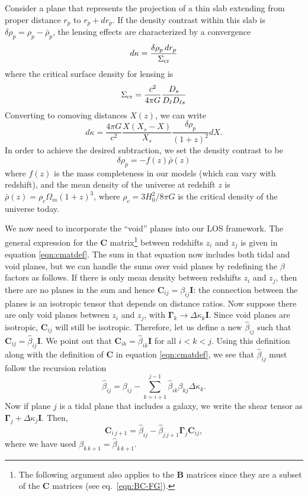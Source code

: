 \documentclass{emulateapj}
\newcommand\B[0]{\mathbf{B}}
\newcommand\C[0]{\mathbf{C}}
\newcommand\I[0]{\mathbf{I}}
\newcommand\GammaMat[0]{\boldsymbol{\Gamma}}
\newcommand\drho{\delta\rho}
\newcommand\Sigcrit{\Sigma_{\rm{cr}}}
\newcommand\betahat{\hat{\beta}}
\begin{document}
Consider a plane that represents the projection of a thin slab extending from proper distance $r_p$ to $r_p + dr_p$.  If the density contrast within this slab is $\drho_p = \rho_p - \bar\rho_p$, the lensing effects are characterized by a convergence
\begin{equation}
  d\kappa = \frac{\drho_p\,dr_p}{\Sigcrit}
\end{equation}
where the critical surface density for lensing is
\begin{equation}
  \Sigcrit = \frac{c^2}{4 \pi G} \frac{D_s}{D_\ell D_{\ell s}}
\end{equation}
Converting to comoving distances $X(z)$, we can write
\begin{equation}\label{eqn:dkappa}
  d\kappa = \frac{4 \pi G}{c^2}\frac{X (X_s - X)}{X_s} \frac{\drho_p}{(1+z)^2} dX.
\end{equation}
In order to achieve the desired subtraction, we set the density contrast to be
\begin{equation}
  \drho_p = -f(z) \bar{\rho}(z) 
\end{equation}
where $f(z)$ is the mass completeness in our models (which can vary with redshift), and the mean density of the universe at redshift $z$ is $\bar{\rho}(z) = \rho_{c} \Omega_m (1 + z)^3$, where $\rho_{c} = 3 H_0^2 / 8 \pi G$ is the critical density of the universe today.

We now need to incorporate the ``void'' planes into our LOS framework.  The general expression for the $\C$ matrix\footnote{The following argument also applies to the $\B$ matrices since they are a subset of the $\C$ matrices (see eq.\ \ref{eqn:BC-FG}).} between redshifts $z_i$ and $z_j$ is given in equation \ref{eqn:cmatdef}. The sum in that equation now includes both tidal and void planes, but we can handle the sums over void planes by redefining the $\beta$ factors as follows.  If there is only mean density between redshifts $z_i$ and $z_j$, then there are no planes in the sum and hence $\C_{i j} = \beta_{i j } \I$: the connection between the planes is an isotropic tensor that depends on distance ratios. Now suppose there are only void planes between $z_i$ and $z_j$, with $\GammaMat_k \rightarrow \Delta \kappa_k \I$. Since void planes are isotropic, $\C_{i j}$ will still be isotropic. Therefore, let us define a new $\betahat_{i j}$ such that $\C_{i j} = \betahat_{i j} \I$. We point out that $\C_{i k } = \betahat_{i k} \I$ for all $i < k < j$. Using this definition along with the definition of $\C$ in equation \ref{eqn:cmatdef}, we see that $\betahat_{i j}$ must follow the recursion relation
\begin{equation}
\label{eqn:betahatdef}
\betahat_{i j}  = \beta_{i j} - \sum \limits_{k = i +1}^{j -1} \betahat_{i k} \beta_{k j} \Delta \kappa_k.
\end{equation}
Now if plane $j$ is a tidal plane that includes a galaxy, we write the shear tensor as $\GammaMat_j + \Delta \kappa_j \I$. Then,
\begin{equation}
\C_{i \, j +1} = \betahat_{i j}  - \betahat_{j \, j+1} \GammaMat_j \C_{i j},
\end{equation}
where we have used $\beta_{k \, k+1} = \betahat_{k\, k+1}$.
\end{document}
